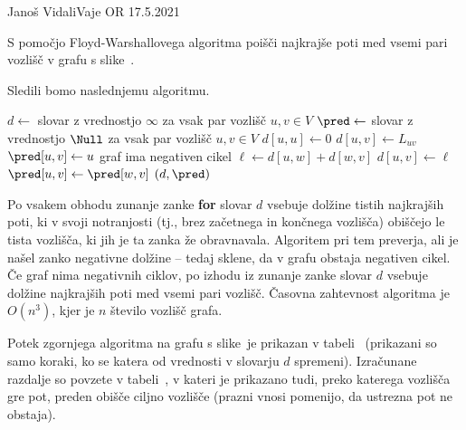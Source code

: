 \begin{naloga}{Janoš Vidali}{Vaje OR 17.5.2021}
\begin{vprasanje}
S pomočjo Floyd-Warshallovega algoritma poišči
najkrajše poti med vsemi pari vozlišč v grafu s slike~\fig[bf].
\end{vprasanje}

\begin{odgovor}
Sledili bomo naslednjemu algoritmu.
\begin{small}
\begin{algorithmic}
    \State $d \gets$ slovar z vrednostjo $\infty$ za vsak par vozlišč $u, v \in V$
    \State $\pred \gets$ slovar z vrednostjo $\Null$
        za vsak par vozlišč $u, v \in V$
        \State $d[u, u] \gets 0$
    \EndFor
        \State $d[u, v] \gets L_{uv}$
        \State $\pred[u, v] \gets u$
    \EndFor
                \State \Return graf ima negativen cikel
            \EndIf
                \State $\ell \gets d[u, w] + d[w, v]$
                    \State $d[u, v] \gets \ell$
                    \State $\pred[u, v] \gets \pred[w, v]$
                \EndIf
            \EndFor
        \EndFor
    \EndFor
    \State \Return $(d, \pred)$
\EndFunction
\end{algorithmic}
\end{small}
Po vsakem obhodu zunanje zanke {\bf for}
slovar $d$ vsebuje dolžine tistih najkrajših poti,
ki v svoji notranjosti (tj., brez začetnega in končnega vozlišča)
obiščejo le tista vozlišča,
ki jih je ta zanka že obravnavala.
Algoritem pri tem preverja, ali je našel zanko negativne dolžine
-- tedaj sklene, da v grafu obstaja negativen cikel.
Če graf nima negativnih ciklov,
po izhodu iz zunanje zanke
slovar $d$ vsebuje dolžine najkrajših poti med vsemi pari vozlišč.
Časovna zahtevnost algoritma je $O(n^3)$,
kjer je $n$ število vozlišč grafa.

Potek zgornjega algoritma na grafu s slike~\fig[bf] je prikazan v tabeli~\tab
(prikazani so samo koraki, ko se katera od vrednosti v slovarju $d$ spremeni).
Izračunane razdalje so povzete v tabeli~\tab[fw-resitev],
v kateri je prikazano tudi,
preko katerega vozlišča gre pot, preden obišče ciljno vozlišče
(prazni vnosi pomenijo, da ustrezna pot ne obstaja).


\end{odgovor}
\end{naloga}
